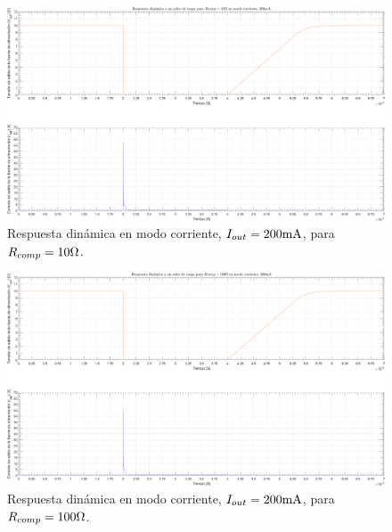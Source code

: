 \clearpage

\begin{figure}[H] %
\begin{center}
\includegraphics[width=1.1 \textwidth, angle=90]{./img/plots/dynamic/power_supply_RCOMP_10_STEP_Modo4.png}
\caption{\label{fig:fig_power_supply_RCOMP_STEP_10_Modo4}\footnotesize{Respuesta dinámica en modo corriente, $I_{out} = 200 \si[per-mode=symbol]{\milli\ampere}$, para $R_{comp} = 10 \si[per-mode=symbol]{\ohm} $.}}
\end{center}
\end{figure}

\clearpage

\begin{figure}[H] %
\begin{center}
\includegraphics[width=1.1 \textwidth, angle=90]{./img/plots/dynamic/power_supply_RCOMP_100_STEP_Modo4.png}
\caption{\label{fig:fig_power_supply_RCOMP_STEP_100_Modo4}\footnotesize{Respuesta dinámica en modo corriente, $I_{out} = 200 \si[per-mode=symbol]{\milli\ampere}$, para $R_{comp} = 100 \si[per-mode=symbol]{\ohm} $.}}
\end{center}
\end{figure}

\clearpage




